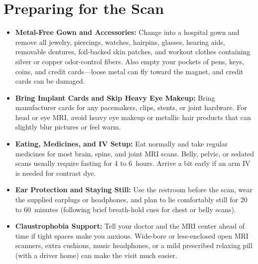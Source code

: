 \section{Preparing for the Scan}
\begin{itemize}
\item \textbf{Metal-Free Gown and Accessories:} Change into a hospital gown and remove all jewelry, piercings, watches, hairpins, glasses, hearing aids, removable dentures, foil-backed skin patches, and workout clothes containing silver or copper odor-control fibers. Also empty your pockets of pens, keys, coins, and credit cards---loose metal can fly toward the magnet, and credit cards can be damaged.
\item \textbf{Bring Implant Cards and Skip Heavy Eye Makeup:} Bring manufacturer cards for any pacemakers, clips, stents, or joint hardware. For head or eye MRI, avoid heavy eye makeup or metallic hair products that can slightly blur pictures or feel warm.
\item \textbf{Eating, Medicines, and IV Setup:} Eat normally and take regular medicines for most brain, spine, and joint MRI scans. Belly, pelvic, or sedated scans usually require fasting for 4 to 6~hours. Arrive a bit early if an arm IV is needed for contrast dye.
\item \textbf{Ear Protection and Staying Still:} Use the restroom before the scan, wear the supplied earplugs or headphones, and plan to lie comfortably still for 20 to 60~minutes (following brief breath-hold cues for chest or belly scans).
\item \textbf{Claustrophobia Support:} Tell your doctor and the MRI center ahead of time if tight spaces make you anxious. Wide-bore or less-enclosed open MRI scanners, extra cushions, music headphones, or a mild prescribed relaxing pill (with a driver home) can make the visit much easier.
\end{itemize}

